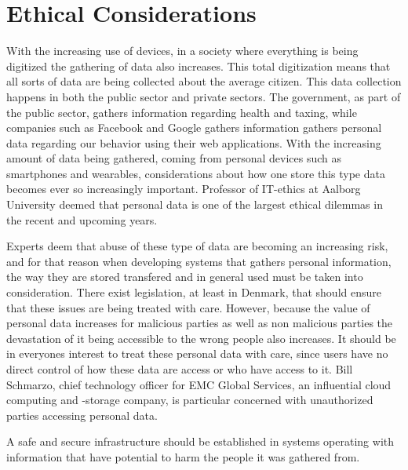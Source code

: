 
\section{Ethical Considerations}
\label{sec:ethical_considerations}

With the increasing use of devices, in a society where everything is being digitized the gathering of data also increases. This total digitization means that all sorts of data are being collected about the average citizen. This data collection happens in both the public sector and private sectors. The government, as part of the public sector, gathers information regarding health and taxing, while companies such as Facebook and Google gathers information gathers personal data regarding our behavior using their web applications. With the increasing amount of data being gathered, coming from personal devices such as smartphones and wearables, considerations about how one store this type data becomes ever so increasingly important. Professor of IT-ethics at Aalborg University deemed that personal data is one of the largest ethical dilemmas in the recent and upcoming years.


Experts deem that abuse of these type of data are becoming an increasing risk, and for that reason when developing systems that gathers personal information, the way they are stored transfered and in general used must be taken into consideration. There exist legislation, at least in Denmark, that should ensure that these issues are being treated with care. However, because the value of personal data increases for malicious parties as well as non malicious parties the devastation of it being accessible to the wrong people also increases. It should be in everyones interest to treat these personal data with care, since users have no direct control of how these data are access or who have access to it. Bill Schmarzo, chief technology officer for EMC Global Services, an influential cloud computing and -storage company, is particular concerned with unauthorized parties accessing personal data.


A safe and secure infrastructure should be established in systems operating with information that have potential to harm the people it was gathered from.